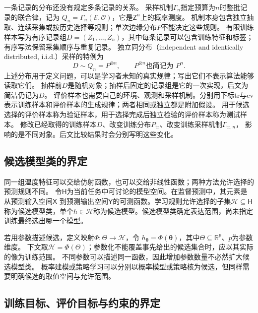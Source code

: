 一条记录的分布还没有规定多条记录的关系。
采样机制$\Gamma_n$指定预算为$n$时整批记录的联合律，记为
$Q_n=\Gamma_n(\mathcal E,\mathcal O)$，它是$\mathsf Z^n$上的概率测度。
机制本身包含独立抽取、连续采集或按历史选择等规则；单次边缘分布$P$不能决定这些规则。
有限训练样本写为有序记录组$D=(Z_1,\ldots,Z_n)$，其中每条记录可以包含训练特征和标签；有序写法保留采集顺序与重复记录。
独立同分布（independent and identically distributed, i.i.d.）采样的特例为
\begin{equation}
  D\sim Q_n=P^{\otimes n},\qquad P^{\otimes n}\text{也简记为 }P^n.
  \label{eq:future-sampling-law}
\end{equation}
上述分布用于定义问题，可以是学习者未知的真实规律；写出它们不表示算法能够读取它们。
抽样前$D$是随机对象；抽样后固定的记录组是它的一次实现，后文为简洁仍记为$D$。
评价样本也需要自己的环境、观测和采样机制。分别用下标$\mathrm{tr}$与$\mathrm{ev}$
表示训练样本和评价样本的生成规律；两者相同或独立都是附加假设。
用于候选选择的评价样本称为验证样本，用于选择完成后独立检验的评价样本称为测试样本。
修改已经取得的训练样本$D$、改变训练分布$P_{\mathrm{tr}}$、改变训练采样机制$\Gamma_{\mathrm{tr},n}$，
影响的是不同对象。后文比较结果时会分别写明这些变化。

\subsection{候选模型类的界定}
\label{sec:future-candidate-model-class}

同一组温度特征可以交给仿射函数，也可以交给非线性函数；两种方法允许选择的预测规则不同。
令$\mathsf H$为当前任务中可讨论的模型空间。在监督预测中，其元素是从预测输入空间$\mathsf X$
到预测输出空间$\mathsf Y$的可测函数。学习规则允许选择的子集$\mathcal H\subseteq\mathsf H$
称为候选模型类，单个$h\in\mathcal H$称为候选模型。候选模型类确定表达范围，尚未指定训练最终选出哪一个模型。

若用参数描述候选，定义映射$\Phi:\Theta\to\mathcal H$，令
$h_{\bm\theta}=\Phi(\bm\theta)$，其中$\Theta\subseteq\mathbb R^p$、$p$为参数维度。
下文取$\mathcal H=\Phi(\Theta)$；参数化不能覆盖事先给出的候选集合时，应以其实际的像为训练范围。
不同参数可以描述同一函数，因此增加参数数量不必然扩大候选模型类。
概率建模或策略学习可以分别以概率模型或策略核为候选，但同样需要明确候选的取值空间与允许范围。

\subsection{训练目标、评价目标与约束的界定}
\label{sec:future-learning-goal-objects}

